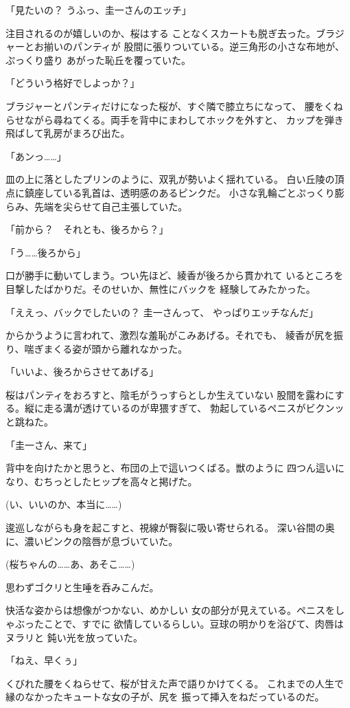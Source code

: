 ﻿\documentclass[
    book,tate,
    line_length=30zw,
    jafontsize=12pt,
    paper=b5j,
    landscape,
    ]{jlreq}
\begin{document}
「見たいの？ うふっ、圭一さんのエッチ」

注目されるのが嬉しいのか、桜はする
ことなくスカートも脱ぎ去った。ブラジャーとお揃いのパンティが
股間に張りついている。逆三角形の小さな布地が、ぷっくり盛り
あがった恥丘を覆っていた。

「どういう格好でしよっか？」

ブラジャーとパンティだけになった桜が、すぐ隣で膝立ちになって、
腰をくねらせながら尋ねてくる。両手を背中にまわしてホックを外すと、
カップを弾き飛ばして乳房がまろび出た。

「あンっ……」

皿の上に落としたプリンのように、双乳が勢いよく揺れている。
白い丘陵の頂点に鎮座している乳首は、透明感のあるピンクだ。
小さな乳輪ごとぷっくり膨らみ、先端を尖らせて自己主張していた。

「前から？　それとも、後ろから？」

「う……後ろから」

口が勝手に動いてしまう。つい先ほど、綾香が後ろから貫かれて
いるところを目撃したばかりだ。そのせいか、無性にバックを
経験してみたかった。

「ええっ、バックでしたいの？ 圭一さんって、
やっぱりエッチなんだ」

からかうように言われて、激烈な羞恥がこみあげる。それでも、
綾香が尻を振り、喘ぎまくる姿が頭から離れなかった。

「いいよ、後ろからさせてあげる」

桜はパンティをおろすと、陰毛がうっすらとしか生えていない
股間を露わにする。縦に走る溝が透けているのが卑猥すぎて、
勃起しているペニスがビクンッと跳ねた。

「圭一さん、来て」

背中を向けたかと思うと、布団の上で這いつくばる。獣のように
四つん這いになり、むちっとしたヒップを高々と掲げた。

(い、いいのか、本当に……)

逡巡しながらも身を起こすと、視線が臀裂に吸い寄せられる。
深い谷間の奥に、濃いピンクの陰唇が息づいていた。

(桜ちゃんの……あ、あそこ……)

思わずゴクリと生唾を呑みこんだ。

快活な姿からは想像がつかない、めかしい
女の部分が見えている。ペニスをしゃぶったことで、すでに
欲情しているらしい。豆球の明かりを浴びて、肉唇はヌラリと
鈍い光を放っていた。

「ねえ、早くぅ」

くびれた腰をくねらせて、桜が甘えた声で語りかけてくる。
これまでの人生で縁のなかったキュートな女の子が、尻を
振って挿入をねだっているのだ。
\end{document}
